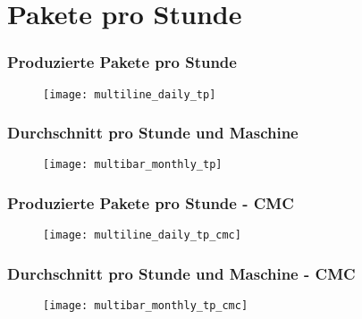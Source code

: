 \section{Pakete pro Stunde}

\begin{frame}
    \frametitle{Produzierte Pakete pro Stunde}

    \begin{figure}
        \centering
        \texttt{[image: multiline\_daily\_tp]}
    \end{figure}

\end{frame}

\begin{frame}
    \frametitle{Durchschnitt pro Stunde und Maschine}

    \begin{figure}
        \centering
        \texttt{[image: multibar\_monthly\_tp]}
    \end{figure}

\end{frame}

\begin{frame}
    \frametitle{Produzierte Pakete pro Stunde - CMC}

    \begin{figure}
        \centering
        \texttt{[image: multiline\_daily\_tp\_cmc]}
    \end{figure}

\end{frame}

\begin{frame}
    \frametitle{Durchschnitt pro Stunde und Maschine - CMC}

    \begin{figure}
        \centering
        \texttt{[image: multibar\_monthly\_tp\_cmc]}
    \end{figure}

\end{frame}